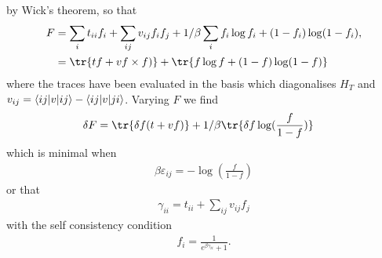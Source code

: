 \documentclass[11pt,twosided]{article}
\begin{document}
by Wick's theorem, so that
\begin{align}
F &= \sum_i t_{ii} f_i + \sum_{ij} v_{ij} f_i f_j + 1/\beta \sum_i f_i \log f_i + (1-f_i) \log (1-f_i),\\
  &= \tr{tf + v f\times f)} + \tr{f \log f + (1-f) \log (1-f)}
\end{align}
where the traces have been evaluated in the basis which diagonalises $H_T$ and $v_{ij} = \langle ij| v |ij\rangle - \langle ij| v |ji\rangle$.
Varying $F$ we find
\begin{align}
\delta F &= \tr{\delta f (t + v f)} + 1/\beta \tr{\delta f \log (\frac{f}{1-f})}
\end{align}
which is minimal when
\begin{align}
\beta \varepsilon_{ij} = - \log (\frac{f}{1-f})
\end{align}
or that
\begin{align}
\gamma_{ii} = t_{ii} + \sum_{ij} v_{ij} f_j
\end{align}
with the self consistency condition
\begin{align}
f_i = \frac{1}{e^{\beta \gamma_{ii}} + 1}.
\end{align}
\end{document}
